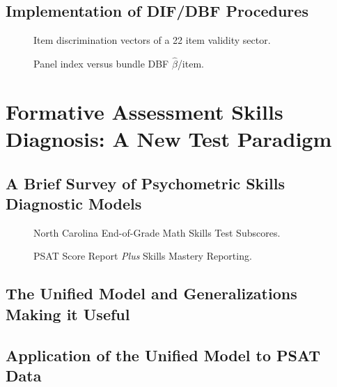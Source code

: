 \documentclass[titlepage,11pt,twoside]{article}
\begin{document}
\subsection{Implementation of DIF/DBF Procedures}


\begin{figure}[h]
\caption{Item discrimination vectors of a 22 item validity sector.}
\end{figure}



\begin{figure}[h]
\caption{Panel index versus bundle DBF $\hat {\beta}$/item.}
\end{figure}



\section{Formative Assessment Skills Diagnosis: A New Test Paradigm}



\subsection{A Brief Survey of Psychometric Skills Diagnostic Models}



\begin{figure}[h]
\caption{North Carolina End-of-Grade Math Skills Test Subscores.}
\end{figure}



\begin{figure}[h]
\caption{PSAT Score Report \textit{Plus} Skills Mastery Reporting.}
\end{figure}




\subsection{The Unified Model and Generalizations Making it Useful}



\subsection{Application of the Unified Model to PSAT Data}
\end{document}
